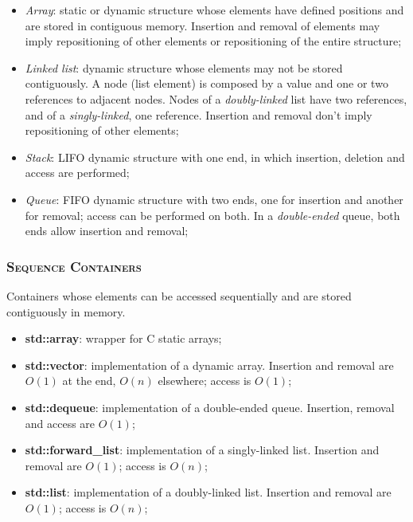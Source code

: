 \documentclass[10pt]{article}
\begin{document}
\begin{multicols*}{5}
{\begin{itemize}[leftmargin=*,topsep=0.25pt]
  \setlength\itemsep{.3pt}
	\item \emph{Array}: static or dynamic structure whose elements have defined positions and are stored in contiguous memory. Insertion and removal of elements may imply repositioning of other elements or repositioning of the entire structure; 
	\item \emph{Linked list}: dynamic structure whose elements may not be stored contiguously. A node (list element) is composed by a value and one or two references to adjacent nodes. Nodes of a \emph{doubly-linked} list have two references, and of a \emph{singly-linked}, one reference. Insertion and removal don't imply repositioning of other elements;
	\item \emph{Stack}: LIFO dynamic structure with one end, in which insertion, deletion and access are performed;
	\item \emph{Queue}: FIFO dynamic structure with two ends, one for insertion and another for removal; access can be performed on both. In a \emph{double-ended} queue, both ends allow insertion and removal;  
\end{itemize}

\subsubsection*{\textsc{Sequence Containers}} 
\noindent
Containers whose elements can be accessed sequentially and are stored contiguously in memory.

\begin{itemize}[leftmargin=*,topsep=0.25pt]
  \setlength\itemsep{.3pt}
	\item \textbf{std::array}: wrapper for C static arrays;
	\item \textbf{std::vector}: implementation of a dynamic array. Insertion and removal are $O(1)$ at the end, $O(n)$ elsewhere; access is $O(1)$;
	\item \textbf{std::dequeue}: implementation of a double-ended queue. Insertion, removal and access are $O(1)$;
	\item \textbf{std::forward\_list}: implementation of a singly-linked list. Insertion and removal are $O(1)$; access is $O(n)$;  
	\item \textbf{std::list}: implementation of a doubly-linked list. Insertion and removal are $O(1)$; access is $O(n)$;  
\end{itemize}

}
\end{multicols*}
\end{document}
